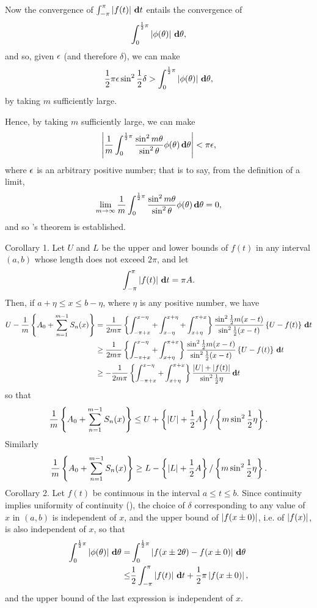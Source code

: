 Now the convergence of
$\int_{-\pi}^{\pi} \left| f(t) \right| \, \mathbf{d} t$
entails the convergence of
$$
\int_{0}^{\frac{1}{2} \pi}
\left| \phi(\theta) \right|
\, \mathbf{d} \theta,
$$
and so, given $\epsilon$ (and therefore $\delta$), we can make
$$
\frac{1}{2} \pi \epsilon
\sin^{2} \frac{1}{2} \delta
>
\int_{0}^{\frac{1}{2}\pi}
\left|  \phi(\theta)  \right|
\, \mathbf{d} \theta,
$$
by taking $m$ sufficiently large.

Hence, by taking $m$ sufficiently large, we can make
$$
\left| 
  \frac{1}{m}
  \int_{0}^{\frac{1}{2} \pi}
  \frac{\sin^{2} m \theta}{\sin^{2} \theta}
  \phi(\theta)
  \, \mathbf{d} \theta
 \right|
<
\pi \epsilon,
$$
where $\epsilon$ is an arbitrary positive number; that is to say, from the
definition of a limit,
$$
\lim_{m \rightarrow \infty}
\frac{1}{m}
\int_{0}^{\frac{1}{2}\pi}
\frac{\sin^{2} m\theta}{\sin^{2} \theta}
\phi(\theta)
\, \mathbf{d} \theta
=
0,
$$
and so \Fejer's theorem is established.
%
%

Corollary 1. Let $U$ and $L$ be the upper and lower bounds of $f(t)$ in any
interval $(a, b)$ whose length does not exceed $2\pi$, and let
$$
\int_{-\pi}^{\pi} \left| f(t) \right| \, \mathbf{d} t = \pi A.
$$
Then, if $a + \eta \leq x \leq b - \eta$, where $\eta$ is any positive number, we have
\begin{align*}
  U
  -
  \frac{1}{m}
  \left\{ 
    A_{0}
    +
    \sum_{n=1}^{m-1} S_{n}(x)
   \right\}
  &
  =
  \frac{1}{2 m \pi}
  \left\{ 
    \int_{-\pi + x}^{x - \eta}
    + \int_{x - \eta}^{x + \eta}
    + \int_{x + \eta}^{\pi + x}
   \right\}
  \frac{\sin^{2} \frac{1}{2} m (x-t)}{\sin^{2} \frac{1}{2} (x-t)}
  \left\{ 
    U - f(t)
   \right\}
  \, \mathbf{d} t
  \\
  &
  \geq
  \frac{1}{2 m \pi}
  \left\{ 
    \int_{-\pi + x}^{x - \eta}
    + \int_{x + \eta}^{\pi + x}
   \right\}
  \frac{\sin^{2} \frac{1}{2} m (x-t)}{\sin^{2} \frac{1}{2} (x-t)}
  \left\{ 
    U - f(t)
   \right\}
  \, \mathbf{d} t
  \\
  &
  \geq
  -\frac{1}{2 m \pi}
  \left\{ 
    \int_{-\pi + x}^{x - \eta}
    + \int_{x + \eta}^{\pi + x}
   \right\}
  \frac{\left| U \right| + \left| f(t) \right|}{\sin^{2} \frac{1}{2} \eta}
  \, \mathbf{d} t
\end{align*}
so that
$$
\frac{1}{m}
\left\{ 
  A_{0}
  + \sum_{n=1}^{m-1} S_{n}(x)
 \right\}
\leq
U +
\left\{ 
  \left| U \right|
  + \frac{1}{2} A
 \right\}
/
\left\{ 
  m \sin^{2} \frac{1}{2} \eta
 \right\}.
$$
Similarly
$$
\frac{1}{m}
\left\{ 
  A_{0}
  + \sum_{n=1}^{m-1} S_{n}(x)
 \right\}
\geq
L -
\left\{ 
  \left| L \right|
  + \frac{1}{2} A
 \right\}
/
\left\{ 
  m \sin^{2} \frac{1}{2} \eta
 \right\}.
$$
Corollary 2. Let $f(t)$ be continuous in the interval $a \leq t \leq b$. Since
continuity implies uniformity of continuity (), the choice of
$\delta$ corresponding to any value of $x$ in $(a, b)$ is independent of $x$, and the
upper bound of $\left| f(x \pm 0) \right|$, i.e. of $\left| f(x) \right|$, is also independent of $x$,
so that
\begin{align*}
  \int_{0}^{\frac{1}{2} \pi} \left| \phi(\theta) \right| \, \mathbf{d} \theta
  =&
  \int_{0}^{\frac{1}{2} \pi}
  \left| 
    f(x \pm 2\theta) - f(x \pm 0)
   \right|
  \, \mathbf{d} \theta
  \\
  \leq
  &
  \frac{1}{2} \int_{-\pi}^{\pi} \left| f(t) \right| \, \mathbf{d} t
  + \frac{1}{2} \pi \left| f(x \pm 0) \right|,
\end{align*}
and the upper bound of the last expression is independent of $x$.

